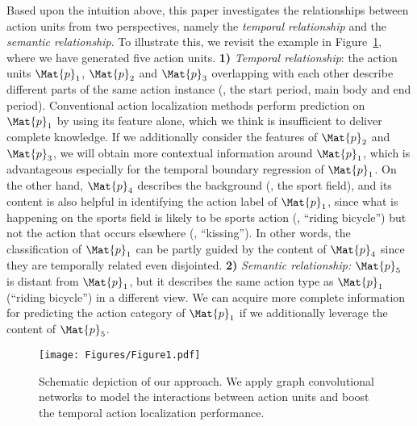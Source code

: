 \documentclass[10pt,journal,compsoc]{IEEEtran}
\begin{document}
	Based upon the intuition above, this paper investigates the relationships between action units from two perspectives, namely the \emph{temporal relationship} and the \emph{semantic relationship}.
	To illustrate this, we revisit the example in Figure~\ref{Fig:simple}, where we have generated five action units.
	\textbf{1)} \emph{Temporal relationship}: the action units $\Mat{p}_1$, $\Mat{p}_2$ and $\Mat{p}_3$ overlapping with each other describe different parts of the same action instance (\ie, the start period, main body and end period).
	Conventional action localization methods perform prediction on $\Mat{p}_1$ by using its feature alone, which we think is insufficient to deliver complete knowledge.
	If we additionally consider the features of $\Mat{p}_2$ and $\Mat{p}_3$, we will obtain more contextual information around $\Mat{p}_1$, which is advantageous especially for the temporal boundary regression of $\Mat{p}_1$.
	On the other hand, $\Mat{p}_4$ describes the background (\ie, the sport field), and its content is also helpful in identifying the action label of $\Mat{p}_1$, since what is happening on the sports field is likely to be sports action (\eg, ``riding bicycle'') but not the action that occurs elsewhere  (\eg, ``kissing''). In other words, the classification of $\Mat{p}_1$ can be partly guided by the content of $\Mat{p}_4$ since they are temporally related even disjointed.
	\textbf{2)} \emph{Semantic relationship:} 
	$\Mat{p}_5$ is distant from $\Mat{p}_1$, but it describes the same action type as $\Mat{p}_1$ (``riding bicycle'') in a different view. We can acquire more complete information for predicting the action category of $\Mat{p}_1$ if we additionally leverage the content of $\Mat{p}_5$.
	\begin{figure}[t]
		\centering
		\texttt{[image: Figures/Figure1.pdf]}
		\caption{Schematic depiction of our approach. We apply graph convolutional networks to model the interactions between action units and boost the temporal action localization performance.}
		\label{Fig:simple}
	\end{figure}
	
\end{document}
